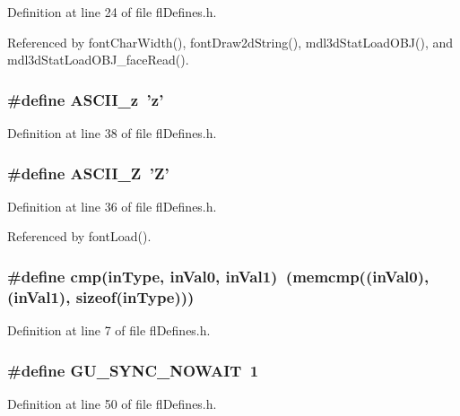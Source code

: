 Definition at line 24 of file fl\-Defines.h.

Referenced by font\-Char\-Width(), font\-Draw2d\-String(), mdl3d\-Stat\-Load\-OBJ(), and mdl3d\-Stat\-Load\-OBJ\_\-face\-Read().
\subsubsection{\setlength{\rightskip}{0pt plus 5cm}\#define ASCII\_\-z~'z'}\label{flDefines_8h_76cb409bf2d31112b1bec0056271e3ce}




Definition at line 38 of file fl\-Defines.h.
\subsubsection{\setlength{\rightskip}{0pt plus 5cm}\#define ASCII\_\-Z~'Z'}\label{flDefines_8h_282e9a9765b0ae5f0a4aa813c3a4932c}




Definition at line 36 of file fl\-Defines.h.

Referenced by font\-Load().
\subsubsection{\setlength{\rightskip}{0pt plus 5cm}\#define cmp(in\-Type, in\-Val0, in\-Val1)~(memcmp((in\-Val0), (in\-Val1), sizeof(in\-Type)))}\label{flDefines_8h_92141b345a236824d8d013e73bbdd401}




Definition at line 7 of file fl\-Defines.h.
\subsubsection{\setlength{\rightskip}{0pt plus 5cm}\#define GU\_\-SYNC\_\-NOWAIT~1}\label{flDefines_8h_2ed5add4ff76bd8f0528d8ad66275130}




Definition at line 50 of file fl\-Defines.h.

